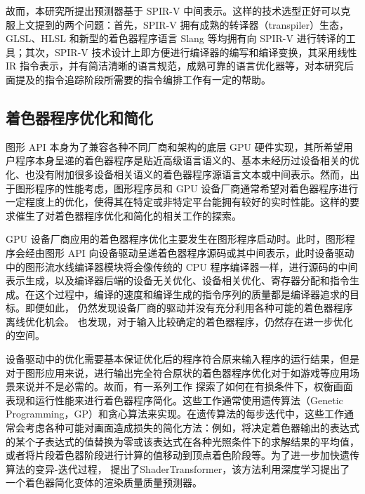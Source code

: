 故而，本研究所提出预测器基于 SPIR-V 中间表示。这样的技术选型正好可以克服上文提到的两个问题：首先，SPIR-V 拥有成熟的转译器（transpiler）生态，GLSL、HLSL 和新型的着色器程序语言 Slang 等均拥有向 SPIR-V 进行转译的工具；其次，SPIR-V 技术设计上即方便进行编译器的编写和编译变换，其采用线性 IR 指令表示，并有简洁清晰的语言规范，成熟可靠的语言优化器等，对本研究后面提及的指令追踪阶段所需要的指令编排工作有一定的帮助。

\subsection{着色器程序优化和简化}

图形 API 本身为了兼容各种不同厂商和架构的底层 GPU 硬件实现，其所希望用户程序本身呈递的着色器程序是贴近高级语言语义的、基本未经历过设备相关的优化、也没有附加很多设备相关语义的着色器程序源语言文本或中间表示。然而，出于图形程序的性能考虑，图形程序员和 GPU 设备厂商通常希望对着色器程序进行一定程度上的优化，使得其在特定或非特定平台能拥有较好的实时性能。这样的要求催生了对着色器程序优化和简化的相关工作的探索。

GPU 设备厂商应用的着色器程序优化主要发生在图形程序启动时。此时，图形程序会经由图形 API 向设备驱动呈递着色器程序源码或其中间表示，此时设备驱动中的图形流水线编译器模块将会像传统的 CPU 程序编译器一样，进行源码的中间表示生成，以及编译器后端的设备无关优化、设备相关优化、寄存器分配和指令生成。在这个过程中，编译的速度和编译生成的指令序列的质量都是编译器追求的目标。即便如此，\citet{8366956} 仍然发现设备厂商的驱动并没有充分利用各种可能的着色器程序离线优化机会。\citet{8891638} 也发现，对于输入比较确定的着色器程序，仍然存在进一步优化的空间。

设备驱动中的优化需要基本保证优化后的程序符合原来输入程序的运行结果，但是对于图形应用来说，进行输出完全符合原状的着色器程序优化对于如游戏等应用场景来说并不是必需的。故而，有一系列工作 \cite{10.1145/3528233.3530722, 10.1145/2661229.2661276, 10.1145/2070781.2024186, 10.1145/2816795.2818104, 9815871} 探索了如何在有损条件下，权衡画面表现和运行性能来进行着色器程序简化。这些工作通常使用遗传算法（Genetic Programming，GP）和贪心算法来实现。在遗传算法的每步迭代中，这些工作通常会考虑各种可能对画面造成损失的简化方法：例如，将决定着色器输出的表达式的某个子表达式的值替换为零或该表达式在各种光照条件下的求解结果的平均值，或者将片段着色器阶段进行计算的值移动到顶点着色阶段等。为了进一步加快遗传算法的变异-迭代过程，\citet{10.1145/3528233.3530722} 提出了ShaderTransformer，该方法利用深度学习提出了一个着色器简化变体的渲染质量质量预测器。

